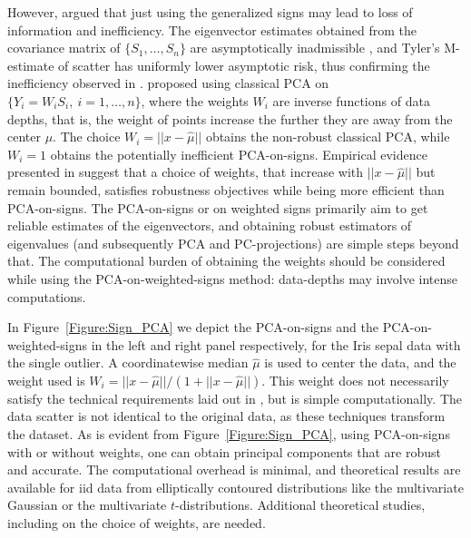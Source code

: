 \documentclass[ss]{imsart}
\theoremstyle{Example}
\begin{document}
However, \cite{majumdar2019weighted} argued that just using the generalized signs may lead to  loss of information and inefficiency. The eigenvector estimates obtained from the covariance matrix of $\{ S_{1}, \ldots, S_{n} \}$ are asymptotically inadmissible \citep{ref:Biometrika14673_MagyarTyler},  and  Tyler's M-estimate of scatter \citep{ref:AoS87234_Tyler} has uniformly lower asymptotic risk, thus confirming the inefficiency observed in \cite{majumdar2019weighted}. \citet{majumdar2019weighted} proposed using classical PCA on  $\{ Y_{i} = W_{i} S_{i}, \ i = 1, \ldots, n \}$, where the weights $W_{i}$ are inverse functions of data depths, that is, the weight of points increase the further they are away from the center $\mu$. The choice $W_{i} = || x - \hat{\mu} ||$ obtains the non-robust classical PCA, while $W_{i} = 1$ obtains the potentially inefficient PCA-on-signs. Empirical evidence presented in \cite{majumdar2019weighted} suggest that a choice of weights, that increase with $|| x - \hat{\mu} ||$ but remain bounded, satisfies robustness objectives while being more efficient than PCA-on-signs. The PCA-on-signs or on weighted signs primarily aim to get reliable estimates of the eigenvectors, and obtaining robust estimators of eigenvalues (and subsequently PCA and PC-projections) are simple steps beyond that. The computational burden of obtaining the weights should be considered while using the PCA-on-weighted-signs method: data-depths may involve intense computations. 

In Figure~\ref{Figure:Sign_PCA} we depict the PCA-on-signs and the PCA-on-weighted-signs  in the left and right panel respectively, for the Iris sepal data with the single outlier.  A coordinatewise median $\hat{\mu}$ is used to center the data, and the weight used is $W_{i} = || x - \hat{\mu} ||/(1 + || x - \hat{\mu} ||)$. This weight does not necessarily satisfy the technical requirements laid out in \cite{majumdar2019weighted}, but is simple computationally. The data scatter is not identical to the original data, as these techniques transform the dataset. As is evident from Figure~\ref{Figure:Sign_PCA}, using PCA-on-signs with or without weights, one can obtain principal components that are robust and accurate. The computational overhead is minimal, and theoretical results are available for iid data from elliptically contoured distributions like the multivariate Gaussian or the multivariate $t$-distributions. Additional theoretical studies, including on the choice of weights, are needed. 
\end{document}

